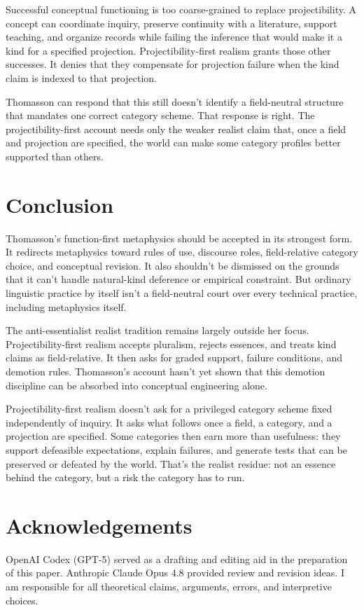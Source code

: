\documentclass[12pt]{article}
\begin{document}
Successful conceptual functioning is too coarse-grained to replace projectibility. A concept can coordinate inquiry, preserve continuity with a literature, support teaching, and organize records while failing the inference that would make it a kind for a specified projection. Projectibility-first realism grants those other successes. It denies that they compensate for projection failure when the kind claim is indexed to that projection.

Thomasson can respond that this still doesn't identify a field-neutral structure that mandates one correct category scheme. That response is right. The projectibility-first account needs only the weaker realist claim that, once a field and projection are specified, the world can make some category profiles better supported than others.

\section{Conclusion}

Thomasson's function-first metaphysics should be accepted in its strongest form. It redirects metaphysics toward rules of use, discourse roles, field-relative category choice, and conceptual revision. It also shouldn't be dismissed on the grounds that it can't handle natural-kind deference or empirical constraint. But ordinary linguistic practice by itself isn't a field-neutral court over every technical practice, including metaphysics itself.

The anti-essentialist realist tradition remains largely outside her focus. Projectibility-first realism accepts pluralism, rejects essences, and treats kind claims as field-relative. It then asks for graded support, failure conditions, and demotion rules. Thomasson's account hasn't yet shown that this demotion discipline can be absorbed into conceptual engineering alone.

Projectibility-first realism doesn't ask for a privileged category scheme fixed independently of inquiry. It asks what follows once a field, a category, and a projection are specified. Some categories then earn more than usefulness: they support defeasible expectations, explain failures, and generate tests that can be preserved or defeated by the world. That's the realist residue: not an essence behind the category, but a risk the category has to run.

\section*{Acknowledgements}

OpenAI Codex (GPT-5) served as a drafting and editing aid in the preparation of this paper. Anthropic Claude Opus 4.8 provided review and revision ideas. I am responsible for all theoretical claims, arguments, errors, and interpretive choices.

\clearpage
\printbibliography
\end{document}
